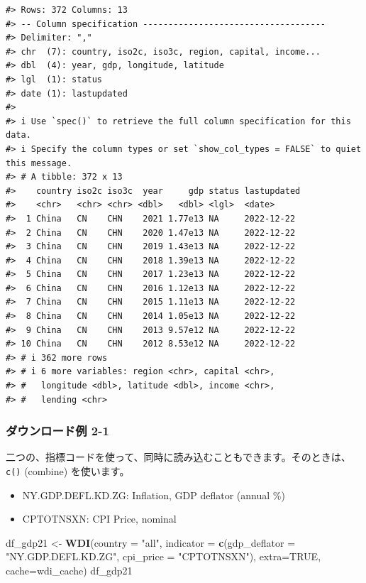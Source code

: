 \documentclass[
  xelatex, ja=standard]{bxjsbook}
\newenvironment{Shaded}{\begin{snugshade}}{\end{snugshade}}
\newcommand{\AttributeTok}[1]{\textcolor[rgb]{0.13,0.29,0.53}{#1}}
\newcommand{\ConstantTok}[1]{\textcolor[rgb]{0.56,0.35,0.01}{#1}}
\newcommand{\FunctionTok}[1]{\textcolor[rgb]{0.13,0.29,0.53}{\textbf{#1}}}
\newcommand{\NormalTok}[1]{#1}
\newcommand{\OtherTok}[1]{\textcolor[rgb]{0.56,0.35,0.01}{#1}}
\newcommand{\StringTok}[1]{\textcolor[rgb]{0.31,0.60,0.02}{#1}}
\providecommand{\tightlist}{%
  \setlength{\itemsep}{0pt}\setlength{\parskip}{0pt}}
\theoremstyle{definition}
\theoremstyle{definition}
\theoremstyle{definition}
\theoremstyle{definition}
\theoremstyle{remark}
\begin{document}
\begin{verbatim}
#> Rows: 372 Columns: 13
#> -- Column specification ------------------------------------
#> Delimiter: ","
#> chr  (7): country, iso2c, iso3c, region, capital, income...
#> dbl  (4): year, gdp, longitude, latitude
#> lgl  (1): status
#> date (1): lastupdated
#> 
#> i Use `spec()` to retrieve the full column specification for this data.
#> i Specify the column types or set `show_col_types = FALSE` to quiet this message.
#> # A tibble: 372 x 13
#>    country iso2c iso3c  year     gdp status lastupdated
#>    <chr>   <chr> <chr> <dbl>   <dbl> <lgl>  <date>     
#>  1 China   CN    CHN    2021 1.77e13 NA     2022-12-22 
#>  2 China   CN    CHN    2020 1.47e13 NA     2022-12-22 
#>  3 China   CN    CHN    2019 1.43e13 NA     2022-12-22 
#>  4 China   CN    CHN    2018 1.39e13 NA     2022-12-22 
#>  5 China   CN    CHN    2017 1.23e13 NA     2022-12-22 
#>  6 China   CN    CHN    2016 1.12e13 NA     2022-12-22 
#>  7 China   CN    CHN    2015 1.11e13 NA     2022-12-22 
#>  8 China   CN    CHN    2014 1.05e13 NA     2022-12-22 
#>  9 China   CN    CHN    2013 9.57e12 NA     2022-12-22 
#> 10 China   CN    CHN    2012 8.53e12 NA     2022-12-22 
#> # i 362 more rows
#> # i 6 more variables: region <chr>, capital <chr>,
#> #   longitude <dbl>, latitude <dbl>, income <chr>,
#> #   lending <chr>
\end{verbatim}

\hypertarget{ux30c0ux30a6ux30f3ux30edux30fcux30c9ux4f8b-2-1}{%
\subsubsection{ダウンロード例 2-1}\label{ux30c0ux30a6ux30f3ux30edux30fcux30c9ux4f8b-2-1}}

二つの、指標コードを使って、同時に読み込むこともできます。そのときは、\texttt{c()} (combine) を使います。

\begin{itemize}
\tightlist
\item
  NY.GDP.DEFL.KD.ZG: Inflation, GDP deflator (annual \%)
\item
  CPTOTNSXN: CPI Price, nominal
\end{itemize}

\begin{Shaded}
\begin{Highlighting}[]
\NormalTok{df\_gdp21 }\OtherTok{\textless{}{-}} \FunctionTok{WDI}\NormalTok{(}\AttributeTok{country =} \StringTok{"all"}\NormalTok{, }
                \AttributeTok{indicator =} \FunctionTok{c}\NormalTok{(}\AttributeTok{gdp\_deflator =} \StringTok{"NY.GDP.DEFL.KD.ZG"}\NormalTok{, }
                              \AttributeTok{cpi\_price =} \StringTok{"CPTOTNSXN"}\NormalTok{), }
                \AttributeTok{extra=}\ConstantTok{TRUE}\NormalTok{, }\AttributeTok{cache=}\NormalTok{wdi\_cache)}
\NormalTok{df\_gdp21}
\end{Highlighting}
\end{Shaded}
\end{document}
